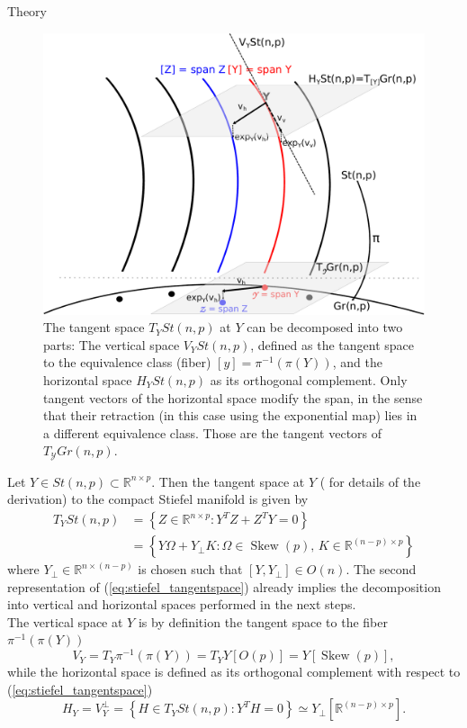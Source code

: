 \begin{chapter}{Theory}
\begin{figure}[h!]
        \centering
	    \includegraphics[width=0.6\linewidth]{./figures/theory/quotienttangentspace.pdf}
	\caption[Vertical and horizontal spaces]{ The tangent space $T_YSt(n,p)$ at $Y$ can be decomposed into 
	two parts: The vertical space $V_YSt(n,p)$, defined as the tangent space to the equivalence class (fiber) 
	$[y]=\pi^{-1}(\pi(Y))$, and the horizontal space $H_YSt(n,p)$ as its orthogonal complement. Only tangent vectors of the horizontal space modify the span, 
	in the sense that their retraction (in this case using the exponential map) lies in a different equivalence class.
	Those are the tangent vectors of $T_{\mathcal{Y}}Gr(n,p)$.
	}
	\label{fig:horizontalspace}
\end{figure}


Let $Y\in St(n,p)\subset\mathbb{R}^{n\times p}$. Then the tangent space at $Y$ (\cite{Absil2009} for details of the derivation) to the compact Stiefel manifold is given by
\begin{align}
    \label{eq:stiefel_tangentspace}
   T_YSt(n,p)	&= \left\lbrace Z\in\mathbb{R}^{n\times p}: Y^TZ+Z^TY=0 \right\rbrace\\
   &=  \left\lbrace Y\Omega + Y_{\bot}K: \Omega\in\operatorname{Skew}(p),\, K\in\mathbb{R}^{(n-p)\times p} \right\rbrace\nonumber
\end{align}
where $Y_{\bot}\in\mathbb{R}^{n\times (n-p)}$ is chosen such that $[Y,Y_{\bot}]\in O(n)$. The second representation of (\ref{eq:stiefel_tangentspace})
already implies the decomposition into vertical and horizontal spaces performed in the next steps.\\

The vertical space at $Y$ is by definition the tangent space to the fiber $\pi^{-1}(\pi(Y))$
\begin{equation}
    \label{eq:stiefel_horizontalspace}
    V_Y = T_Y\pi^{-1}(\pi(Y))=T_YY[O(p)]=Y[\operatorname{Skew}(p)],
\end{equation}
while the horizontal space is defined as its orthogonal complement with respect to (\ref{eq:stiefel_tangentspace})
\begin{equation}
    \label{eq:stiefel_verticalspace}
    H_Y=V_Y^{\bot} =\left\lbrace H\in T_Y St(n,p):Y^TH=0 \right\rbrace \simeq Y_{\bot}[\mathbb{R}^{(n-p)\times p}].
\end{equation}


\end{chapter}
